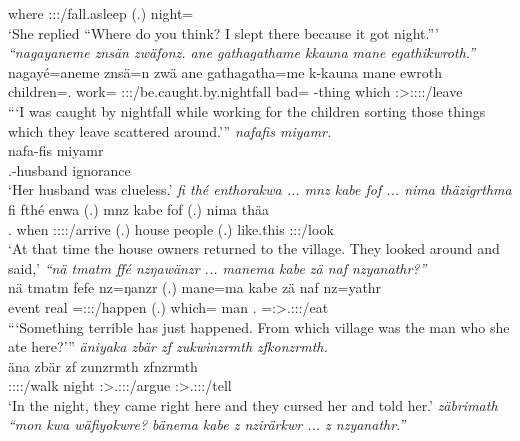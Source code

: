 \begin{exe}
	where \Fut{} \Med{} \Emph{} \Fsg:\Sbj:\Rpst:\Pfv/fall.asleep (.) night=\Char\\
	\trans `She replied ``Where do you think? I slept there because it got night.'''
	\emph{``nagayaneme znsän zwäfonz. ane gathagathame kkauna mane egathikwroth.''}\\
	\gll nagayé=aneme znsä=n zwä ane gathagatha=me k-kauna mane ewroth\\
	children=\Poss.\Nsg{} work=\Loc{} \Fsg:\Sbj:\Rpst:\Pfv/be.caught.by.nightfall \Dem{} bad=\Ins{} \Redup-thing which \Stpl:\Sbj>\Stpl:\Obj:\Nonpast:\Ipfv:\Andat/leave\\
	\trans ```I was caught by nightfall while working for the children sorting those things which they leave scattered around.'''
	\emph{nafafis miyamr.}\\
	\gll nafa-fis miyamr\\
	\Third.\Poss-husband ignorance\\
	\trans `Her husband was clueless.'
	\emph{fi thé enthorakwa ... mnz kabe fof ... nima thäzigrthma}\\
	\gll fi fthé enwa (.) mnz kabe fof (.) nima thäa\\
	\Third.\Abs{} when \Stpl:\Sbj:\Pst:\Ipfv:\Venit/arrive (.) house people \Emph{} (.) {like.this} \Stpl:\Sbj:\Pst:\Pfv/look\\
	\trans `At that time the house owners returned to the village. They looked around and said,'
	\emph{``nä tmatm ffé nzŋawänzr ... manema kabe zä naf nzyanathr?''}\\
	\gll nä tmatm fefe nz=ŋanzr (.) mane=ma kabe zä naf nz=yathr\\
	\Indf{} event real \Immpst=\Stsg:\Sbj:\Nonpast:\Ipfv/happen (.) which=\Char{} man \Prox{} \Tsg.\Erg{} \Immpst=\Stsg:\Sbj>\Tsg.\Masc:\Obj:\Nonpast:\Ipfv/eat\\
	\trans ```Something terrible has just happened. From which village was the man who she ate here?'''
	\emph{äniyaka zbär zf zukwinzrmth zfkonzrmth.}\\
	\gll äna zbär zf zunzrmth zfnzrmth\\
	\Stpl:\Sbj:\Pst:\Ipfv:\Venit/walk night \Imm{} \Stpl:\Sbj>\Tsg.\F:\Obj:\Pst:\Dur/argue \Stpl:\Sbj>\Tsg.\F:\Obj:\Pst:\Dur/tell\\
	\trans `In the night, they came right here and they cursed her and told her.'
	\emph{zäbrimath ``mon kwa wäfiyokwre? bänema kabe z nzirärkwr ... z nzyanathr.''}\\

\end{exe}
